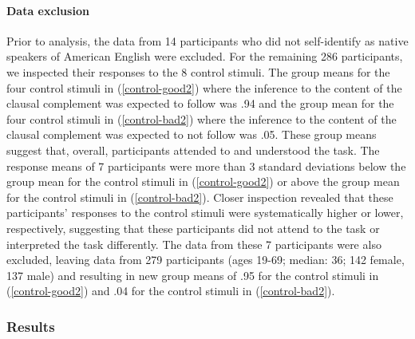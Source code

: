 \documentclass[11pt,fleqn]{article}
\newcommand{\6}{\mbox{$[\hspace*{-.6mm}[$}}
\newcommand{\9}{\mbox{$]\hspace*{-.6mm}]$}}
\begin{document}
\paragraph{Data exclusion}

Prior to analysis, the data from 14 participants who did not self-identify as native speakers of American English were excluded. For the remaining 286 participants, we inspected their responses to the 8 control stimuli. The group means for the four control stimuli in (\ref{control-good2}) where the inference to the content of the clausal complement was expected to follow was .94 and the group mean for the four control stimuli in (\ref{control-bad2}) where the inference to the content of the clausal complement was expected to not follow was .05. These group means suggest that, overall, participants attended to and understood the task. The response means of 7 participants were more than 3 standard deviations below the group mean for the control stimuli in (\ref{control-good2}) or above the group mean for the control stimuli in (\ref{control-bad2}). Closer inspection revealed that these participants' responses to the control stimuli were systematically higher or lower, respectively, suggesting that these participants did not attend to the task or interpreted the task differently. The data from these 7 participants were also excluded, leaving data from 279 participants (ages 19-69; median: 36; 142 female, 137 male) and resulting in new group means of .95 for the control stimuli in (\ref{control-good2}) and .04 for the control stimuli in (\ref{control-bad2}).

\subsubsection{Results}
\end{document}
